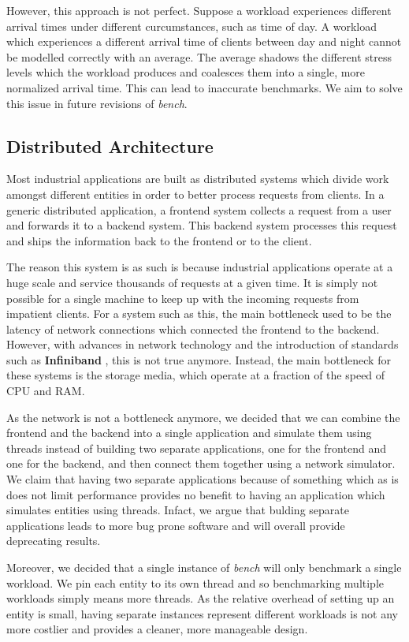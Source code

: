\documentclass[10pt, author, twocolumn]{article}
\begin{document}
However, this approach is not perfect. Suppose a workload experiences different arrival times under different curcumstances, such as time of day. A workload which experiences a different arrival time of clients between day and night cannot be modelled correctly with an average. The average shadows the different stress levels which the workload produces and coalesces them into a single, more normalized arrival time. This can lead to inaccurate benchmarks. We aim to solve this issue in future revisions of \textit{bench}.

\subsection{Distributed Architecture}
Most industrial applications are built as distributed systems which divide work amongst different entities in order to better process requests from clients. In a generic distributed application, a frontend system collects a request from a user and forwards it to a backend system. This backend system processes this request and ships the information back to the frontend or to the client. 

The reason this system is as such is because industrial applications operate at a huge scale and service thousands of requests at a given time. It is simply not possible for a single machine to keep up with the incoming requests from impatient clients. For a system such as this, the main bottleneck used to be the latency of network connections which connected the frontend to the backend. However, with advances in network technology and the introduction of standards such as \textbf{Infiniband} \cite{}, this is not true anymore. Instead, the main bottleneck for these systems is the storage media, which operate at a fraction of the speed of CPU and RAM. 

As the network is not a bottleneck anymore, we decided that we can combine the frontend and the backend into a single application and simulate them using threads instead of building two separate applications, one for the frontend and one for the backend, and then connect them together using a network simulator. We claim that having two separate applications because of something which as is does not limit performance provides no benefit to having an application which simulates entities using threads. Infact, we argue that bulding separate applications leads to more bug prone software and will overall provide deprecating results. 

Moreover, we decided that a single instance of \textit{bench} will only benchmark a single workload. We pin each entity to its own thread and so benchmarking multiple workloads simply means more threads. As the relative overhead of setting up an entity is small, having separate instances represent different workloads is not any more costlier and provides a cleaner, more manageable design. 
\end{document}
